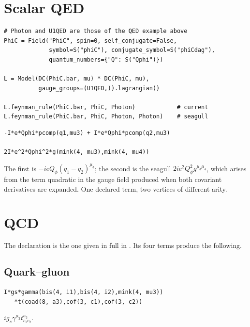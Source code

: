 \section{Scalar QED}

\begin{verbatim}
# Photon and U1QED are those of the QED example above
PhiC = Field("PhiC", spin=0, self_conjugate=False,
             symbol=S("phiC"), conjugate_symbol=S("phiCdag"),
             quantum_numbers={"Q": S("Qphi")})

L = Model(DC(PhiC.bar, mu) * DC(PhiC, mu),
          gauge_groups=(U1QED,)).lagrangian()

L.feynman_rule(PhiC.bar, PhiC, Photon)            # current
L.feynman_rule(PhiC.bar, PhiC, Photon, Photon)    # seagull
\end{verbatim}

\begin{verbatim}
-I*e*Qphi*pcomp(q1,mu3) + I*e*Qphi*pcomp(q2,mu3)

2I*e^2*Qphi^2*g(mink(4, mu3),mink(4, mu4))
\end{verbatim}

\noindent The first is $-i e Q_\phi (q_1 - q_2)^{\mu_3}$; the second is the
seagull $2 i e^2 Q_\phi^2 g^{\mu_3\mu_4}$, which arises from the term
quadratic in the gauge field produced when both covariant derivatives are
expanded. One declared term, two vertices of different arity.

\section{QCD}

The declaration is the one given in full in .
Its four terms produce the following.

\subsection*{Quark--gluon}

\begin{verbatim}
I*gs*gamma(bis(4, i1),bis(4, i2),mink(4, mu3))
   *t(coad(8, a3),cof(3, c1),cof(3, c2))
\end{verbatim}

\noindent $i g_s \gamma^{\mu_3} t^{a_3}_{c_1 c_2}$.

